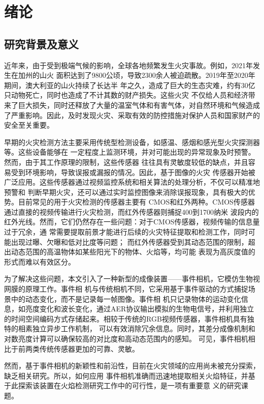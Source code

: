 
\chapter{绪论}

\section{研究背景及意义}

近年来，由于受到极端气候的影响，全球各地频繁发生火灾事故。例如，2021年发生在加州的山火
面积达到了9800公顷，导致2300余人被迫疏散。2019年至2020年期间，澳大利亚的山火持续了长达半
年之久，造成了巨大的生态灾难，约有30亿只动物死亡，同时也造成了不计其数的财产损失。这些火灾
不仅给人员和经济带来了巨大损失，同时还释放了大量的温室气体和有害气体，对自然环境和气候造成
了严重影响。因此，及时发现火灾、采取有效的防控措施对保护人员和国家财产的安全至关重要。

早期的火灾检测方法主要采用传统型检测设备，如感温、感烟和感光型火灾探测器等。这些设备能够在
一定程度上监测环境，并对可能出现的异常现象及时预警。然而，由于其工作原理的限制，这些传感器
往往具有灵敏度较低的缺点，并且容易受到环境影响，导致误报或漏报的情况。因此，基于图像的火灾
传感器开始被广泛应用。这些传感器通过视频监控系统和相关算法的处理分析，不仅可以精准地预警和
判断早期火灾，还可以通过实时监控图像来消除误报现象，具有极大的优势。目前常见的用于火灾检测的传感器主要有
CMOS和红外两种。CMOS传感器通过直接的视频传输进行火灾检测，而红外传感器则捕捉400到1700纳米
波段内的红外光线。然而，它们仍然存在一些问题：对于CMOS传感器，视频传输的信息量过于冗余，通
常需要提取前景才能进行后续的火灾特征提取和检测工作，同时可能出现过曝、欠曝和低对比度等问题；
而红外传感器受到其动态范围的限制，超出动态范围的高温物体如某些阳光下的物体、火焰等，均可能
表现为高灰度值的形式而难以有效区分。

为了解决这些问题，本文引入了一种新型的成像装置——事件相机，它模仿生物视网膜的原理工作\cite{gallego2020event,posch2014retinomorphic}。事件相
机与传统相机不同，它采用基于事件驱动的方式捕捉场景中的动态变化，而不是记录每一帧图像。事件相
机只记录物体的运动变化信息，如亮度变化和波长变化，通过AER协议\cite{rivas2005tools}输出模拟的生物电信号，并利用独立
的时间空间编码方式存储起来。相较于传统的RGB视频传感器，事件相机具有独特的相素独立异步工作机制，
可以有效消除冗余信息。同时，其差分成像机制和对数亮度计算可以确保较高的对比度和高动态范围内的感知。
可见，事件相机相比于前两类传统传感器更加的可靠、灵敏。

然而，基于事件相机的新颖性和前沿性，目前在火灾领域的应用尚未被充分探索，缺乏相关研究。所以，如何应用
事件相机准确而迅速地提取相关火焰特征，并基于此探索该装置在火焰检测研究工作中的可行性，是一项有重要意
义的研究课题。


